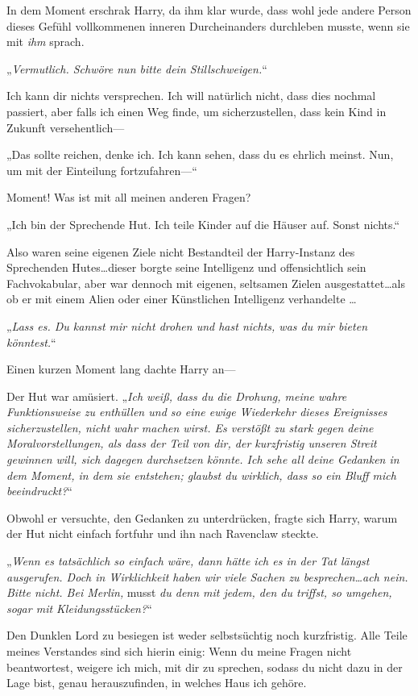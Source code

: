 {In dem Moment erschrak Harry, da ihm klar wurde, dass wohl jede andere Person dieses Gefühl vollkommenen inneren Durcheinanders durchleben musste, wenn sie mit \emph{ihm} sprach.

„\emph{Vermutlich. Schwöre nun bitte dein Stillschweigen.}“

Ich kann dir nichts versprechen. Ich will natürlich nicht, dass dies nochmal passiert, aber falls ich einen Weg finde, um sicherzustellen, dass kein Kind in Zukunft versehentlich—

„Das sollte reichen, denke ich. Ich kann sehen, dass du es ehrlich meinst. Nun, um mit der Einteilung fortzufahren—“

Moment! Was ist mit all meinen anderen Fragen?

„Ich bin der Sprechende Hut. Ich teile Kinder auf die Häuser auf. Sonst nichts.“

Also waren seine eigenen Ziele nicht Bestandteil der Harry-Instanz des Sprechenden Hutes…dieser borgte seine Intelligenz und offensichtlich sein Fachvokabular, aber war dennoch mit eigenen, seltsamen Zielen ausgestattet…als ob er mit einem Alien oder einer Künstlichen Intelligenz verhandelte …

„\emph{Lass es. Du kannst mir nicht drohen und hast nichts, was du mir bieten könntest.}“

Einen kurzen Moment lang dachte Harry an—

Der Hut war amüsiert. „\emph{Ich weiß, dass du die Drohung, meine wahre Funktionsweise zu enthüllen und so eine ewige Wiederkehr dieses Ereignisses sicherzustellen, nicht wahr machen wirst. Es verstößt zu stark gegen deine Moralvorstellungen, als dass der Teil von dir, der kurzfristig unseren Streit gewinnen will, sich dagegen durchsetzen könnte. Ich sehe all deine Gedanken in dem Moment, in dem sie entstehen; glaubst du wirklich, dass so ein Bluff mich beeindruckt?}“

Obwohl er versuchte, den Gedanken zu unterdrücken, fragte sich Harry, warum der Hut nicht einfach fortfuhr und ihn nach Ravenclaw steckte.

„\emph{Wenn es tatsächlich so einfach wäre, dann hätte ich es in der Tat längst ausgerufen. Doch in Wirklichkeit haben wir viele Sachen zu besprechen…ach nein. Bitte nicht. Bei Merlin,} musst \emph{du denn mit jedem, den du triffst, so umgehen, sogar mit Kleidungsstücken?}“

Den Dunklen Lord zu besiegen ist weder selbstsüchtig noch kurzfristig. Alle Teile meines Verstandes sind sich hierin einig: Wenn du meine Fragen nicht beantwortest, weigere ich mich, mit dir zu sprechen, sodass du nicht dazu in der Lage bist, genau herauszufinden, in welches Haus ich gehöre.

}
